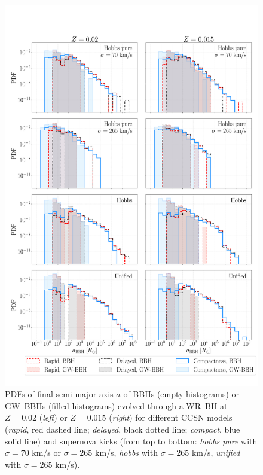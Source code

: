 \documentclass[a4paper,titlepage]{book}     	%
\begin{document}
\begin{appendices}
\begin{figure}
	\centering
	\includegraphics[width=\textwidth]{./images/rema.pdf}	
	\caption{PDFs of final semi-major axis $a$ of BBHs (empty histograms) or GW--BBHs (filled histograms) evolved through a WR--BH at $Z=0.02$ (\emph{left}) or $Z=0.015$ (\emph{right}) for different CCSN models (\emph{rapid}, red dashed line; \emph{delayed}, black dotted line; \emph{compact}, blue solid line) and supernova kicks (from top to bottom: \emph{hobbs pure} with $\sigma = 70$ km/s or $\sigma = 265$ km/s, \emph{hobbs} with $\sigma = 265$ km/s, \emph{unified} with $\sigma = 265$ km/s).}\label{fig:resultsarem}
\end{figure}










\end{appendices}
\end{document}
